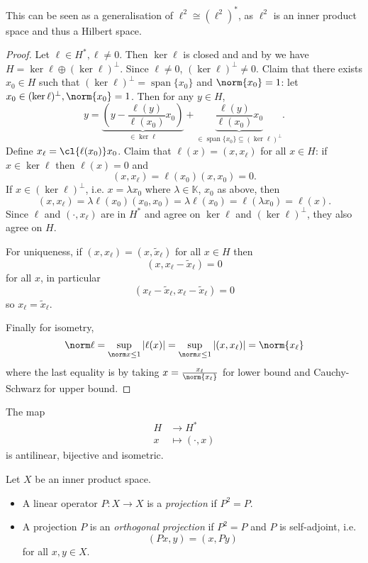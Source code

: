 \documentclass[a4paper]{article}
\newcommand{\K}{{\mathbb{K}}} %
\DeclareMathOperator{\spans}{span} %
\begin{document}
This can be seen as a generalisation of \(\ell^2 \cong (\ell^2)^*\), as \(\ell^2\) is an inner product space and thus a Hilbert space.

\begin{proof}
  Let \(\ell \in H^*, \ell \neq 0\). Then \(\ker \ell\) is closed and and by  we have \(H = \ker \ell \oplus (\ker \ell)^\perp\). Since \(\ell \neq 0\), \((\ker \ell)^\perp \neq 0\). Claim that there exists \(x_0 \in H\) such that \((\ker \ell)^\perp = \spans \{x_0\}\) and \(\norm{x_0} = 1\): let \(x_0 \in (\ker \ell)^\perp, \norm{x_0} = 1\). Then for any \(y \in H\),
  \[
    y = \underbrace{(y - \frac{\ell(y)}{\ell(x_0)} x_0)}_{\in \ker \ell} + \underbrace{\frac{\ell(y)}{\ell(x_0)} x_0}_{\in \spans \{x_0\} \subseteq (\ker \ell)^\perp}.
  \]
  Define \(x_\ell = \cl{\ell(x_0)} x_0\). Claim that \(\ell(x) = (x, x_\ell)\) for all \(x \in H\): if \(x \in \ker \ell\) then \(\ell(x) = 0\) and
  \[
    (x, x_\ell) = \ell(x_0) (x, x_0) = 0.
  \]
  If \(x \in (\ker \ell)^\perp\), i.e. \(x = \lambda x_0\) where \(\lambda \in \K\), \(x_0\) as above, then
  \[
    (x, x_\ell) = \lambda \ell(x_0) (x_0, x_0) = \lambda \ell(x_0) = \ell(\lambda x_0) = \ell(x).
  \]
  Since \(\ell\) and \((\cdot, x_\ell)\) are in \(H^*\) and agree on \(\ker \ell\) and \((\ker \ell)^\perp\), they also agree on \(H\). %

  For uniqueness, if \((x, x_\ell) = (x, \tilde x_\ell)\) for all \(x \in H\) then
  \[
    (x, x_\ell - \tilde x_\ell) = 0
  \]
  for all \(x\), in particular
  \[
    (x_\ell - \tilde x_\ell, x_\ell - \tilde x_\ell) = 0
  \]
  so \(x_\ell = \tilde x_\ell\).

  Finally for isometry,
  \[
    \norm \ell = \sup_{\norm x \leq 1} |\ell(x)| = \sup_{\norm x \leq 1} |(x, x_\ell)| = \norm{x_\ell}
  \]
  where the last equality is by taking \(x = \frac{x_\ell}{\norm{x_\ell}}\) for lower bound and Cauchy-Schwarz for upper bound.
\end{proof}

\begin{corollary}
  The map
  \begin{align*}
    H &\to H^* \\
    x &\mapsto (\cdot, x)
  \end{align*}
  is antilinear, bijective and isometric.
\end{corollary}

\begin{definition}
  Let \(X\) be an inner product space.
  \begin{itemize}
  \item A linear operator \(P: X \to X\) is a \emph{projection} if \(P^2 = P\).
  \item A projection \(P\) is an \emph{orthogonal projection} if \(P^2 = P\) and \(P\) is self-adjoint, i.e.
    \[
      (Px, y) = (x, Py)
    \]
    for all \(x, y \in X\).
  \end{itemize}
\end{definition}
\end{document}
